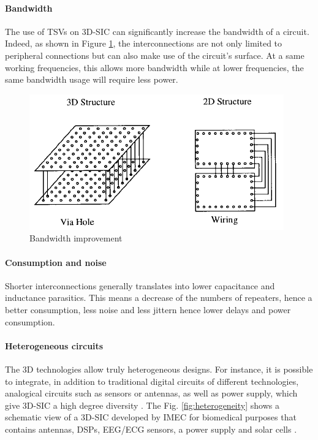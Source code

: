 \paragraph{Bandwidth}

The use of TSVs on 3D-SIC can significantly increase the bandwidth of a circuit. Indeed, as shown in Figure \ref{fig:bandwidth}, the interconnections are not only limited to peripheral connections but can also make use of the circuit's surface. At a same working frequencies, this allows more bandwidth while at lower frequencies, the same bandwidth usage will require less power.

\begin{figure}[h!]
\begin{center}
\includegraphics[width=0.75\linewidth]{bandwidth.png}
\end{center}
\vspace{-0.5cm}
\caption{Bandwidth improvement \cite{659500}}
\label{fig:bandwidth}
\end{figure}

\paragraph{Consumption and noise}

Shorter interconnections generally translates into lower capacitance and inductance parasitics. This means a decrease of the numbers of repeaters, hence a better consumption, less noise and less jittern hence lower delays and power consumption.

\paragraph{Heterogeneous circuits}

The 3D technologies allow truly heterogeneous designs. For instance, it is possible to integrate, in addition to traditional digital circuits of different technologies, analogical circuits such as sensors or antennas, as well as power supply, which give 3D-SIC a high degree diversity \cite{4299568}. The Fig. \ref{fig:heterogeneity} shows a schematic view of a 3D-SIC developed by IMEC for biomedical purposes that contains antennas, DSPs, EEG/ECG sensors, a power supply and solar cells \cite{4198870}.

